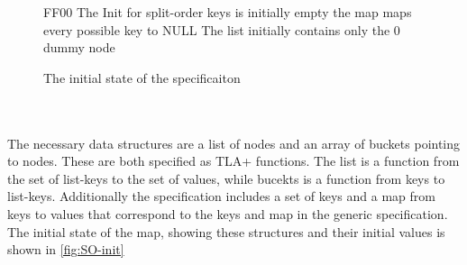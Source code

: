 \documentclass{uit-thesis}
\begin{document}
\begin{figure}
\begin{tla}
\end{tla}
\begin{tlatex}
%
\@pvspace{8.0pt}%
\@pvspace{8.0pt}%
\@pvspace{8.0pt}%
\@x{ {\ASSUME}}%
%
%
%
\@pvspace{8.0pt}%
\begin{lcom}{0}%
\begin{cpar}{0}{F}{F}{0}{0}{}%
The Init for split-order                          
 keys is initially empty                           
 the map maps every possible key to NULL           
 The list initially contains only the 0 dummy node 
\end{cpar}%
\end{lcom}%
%
%
%
%
%
\@pvspace{8.0pt}%
\end{tlatex}
\caption{The initial state of the specificaiton}
\label{fig:SO-init}
\end{figure}
\\\\
The necessary data structures are a list of nodes and an array of buckets pointing to nodes. These are both specified as TLA+ functions. The list is a function from the set of list-keys to the set of values, while bucekts is a function from keys to list-keys. Additionally the specification includes a set of keys and a map from keys to values that correspond to the keys and map in the generic specification. The initial state of the map, showing these structures and their initial values is shown in \autoref{fig:SO-init}
\end{document}
